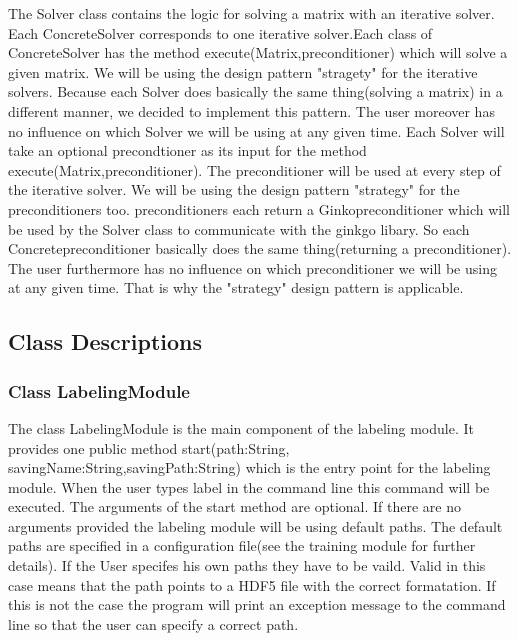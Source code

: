 \documentclass[parskip=full]{scrartcl}
\begin{document}
The Solver class contains the logic for solving a matrix with an \gls{iterative solver}.
Each ConcreteSolver corresponds to one \gls{iterative solver}.Each class of ConcreteSolver has the method execute(Matrix,\gls{preconditioner}) which will solve a given matrix.
We will be using the design pattern "stragety" for the \glspl{iterative solver}.
Because each Solver does basically the same thing(solving a matrix) in a different manner, we decided to implement this pattern.
The user moreover has no influence on which Solver we will be using at any given time.
Each Solver will take an optional precondtioner as its input for the method execute(Matrix,\gls{preconditioner}).
The \gls{preconditioner} will be used at every step of the \gls{iterative solver}.
We will be using the design pattern "\gls{strategy}" for the \glspl{preconditioner} too. \glspl{preconditioner} each return a Ginko\gls{preconditioner} which will be used by the Solver class to communicate with the ginkgo libary.
So each Concrete\gls{preconditioner} basically does the same thing(returning a \gls{preconditioner}).
The user furthermore has no influence on which \gls{preconditioner} we will be using at any given time. That is why the "\gls{strategy}" design pattern is applicable.

\subsection{Class Descriptions}

\subsubsection{Class LabelingModule}
The class LabelingModule is the main component of the labeling module.
It provides one public method start(path:String, savingName:String,savingPath:String) which is the entry point for the labeling module.
When the user types label in the command line this command will be executed.
The arguments of the start method are optional.
If there are no arguments provided the labeling module will be using default paths.
The default paths are specified in a configuration file(see the training module for further details).
If the User specifes his own paths they have to be vaild.
Valid in this case means that the path points to a \gls{HDF5} file with the correct formatation.
If this is not the case the program will print an exception message to the command line so that the user can specify a correct path.
\end{document}
